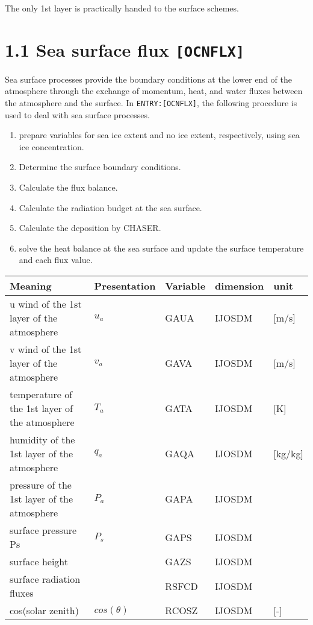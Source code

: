 The only 1st layer is practically handed to the surface schemes.

\hypertarget{sea-surface-flux-ocnflx}{%
\section{\texorpdfstring{1.1 Sea surface flux
\texttt{{[}OCNFLX{]}}}{1.1 Sea surface flux {[}OCNFLX{]}}}\label{sea-surface-flux-ocnflx}}

Sea surface processes provide the boundary conditions at the lower end
of the atmosphere through the exchange of momentum, heat, and water
fluxes between the atmosphere and the surface. In
\texttt{ENTRY:{[}OCNFLX{]}}, the following procedure is used to deal
with sea surface processes.

\begin{enumerate}
\def\labelenumi{\arabic{enumi}.}
\tightlist
\item
  prepare variables for sea ice extent and no ice extent, respectively,
  using sea ice concentration.
\item
  Determine the surface boundary conditions.
\item
  Calculate the flux balance.
\item
  Calculate the radiation budget at the sea surface.
\item
  Calculate the deposition by CHASER.
\item
  solve the heat balance at the sea surface and update the surface
  temperature and each flux value.
\end{enumerate}

\setlength\LTleft{0pt}\setlength\LTright{0pt}\begin{longtable}[]{@{}lllll@{}}
\toprule\relax
Meaning & Presentation & Variable & dimension & unit \\
\midrule\relax
\endhead
u wind of the 1st layer of the atmosphere & \(u_a\) & GAUA & IJOSDM &
{[}m/s{]} \\
v wind of the 1st layer of the atmosphere & \(v_a\) & GAVA & IJOSDM &
{[}m/s{]} \\
temperature of the 1st layer of the atmosphere & \(T_a\) & GATA & IJOSDM
& {[}K{]} \\
humidity of the 1st layer of the atmosphere & \(q_a\) & GAQA & IJOSDM &
{[}kg/kg{]} \\
pressure of the 1st layer of the atmosphere & \(P_a\) & GAPA & IJOSDM
& \\
surface pressure Ps & \(P_s\) & GAPS & IJOSDM & \\
surface height & & GAZS & IJOSDM & \\
surface radiation fluxes & & RSFCD & IJOSDM & \\
cos(solar zenith) & \(cos(\theta)\) & RCOSZ & IJOSDM & {[}-{]} \\
\bottomrule
\end{longtable}

